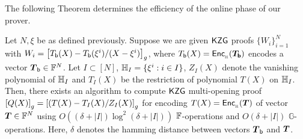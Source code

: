 \begin{comment}
        \item In addition, the other things (apart from $[Q(X)]_2$) needed for the current round of the lookup protocol are also computed by the prover as described in the lookup protocol in section 5.1 as it is just naive computation

    \end{enumerate}
    \subsection{Computation of $[Q(X)]_2$}
    Clearly, it suffices to efficiently compute $[Q(X)]_2$ where $[Q(X)]_2=\gtwo{\frac{T(X)-T_I(X)}{Z_I(X)}}$. We have the information of $[\Tbasepoly{X}-\Tbasepoly{\xi^i}/(X-\xi^i)]_2$. For this, we have the following lemma:
\end{comment}
The following Theorem determines the efficiency of the online phase of our prover.
\begin{theorem}\label{thm:approx-setup}
Let $N,\xi$ be as defined previously. Suppose we are given
$\mathsf{KZG}$ proofs $\{W_i\}_{i=1}^N$ with $W_i=\left[{T_{\mathsf{b}}({X}) - T_{\mathsf{b}}({\xi^i})/(X-\xi^i)}\right]_g$, where
$\Tbasepoly{X}=\enc{T_{\mathsf{b}}}{\setN}$ encodes a vector $\vecTbase\in \F^N$.
Let $I \subset [N]$, $\mathbb{H}_I=\{\xi^i:i\in I\}$, $Z_I(X)$ denote the vanishing polynomial of $\mathbb{H}_I$ and
$T_I(X)$ be the restriction of polynomial $T(X)$ on $\mathbb{H}_I$.
Then, there exists an algorithm to compute $\mathsf{KZG}$ multi-opening proof
$\left[{Q(X)}\right]_g=\left[{(T(X) - T_I(X)/Z_I(X)}\right]_g$ for encoding $T(X)=\enc{T}{\setN}$ of vector $\vecT\in \F^N$ using $O((\delta + |I|) \log^2 (\delta + |I|))$ $\mathbb{F}$-operations
and $O(\delta + |I|)$ $\mathbb{G}$-operations. Here, $\delta$ denotes the hamming distance
between vectors $\vecTbase$ and $\vecT$.
\end{theorem}
